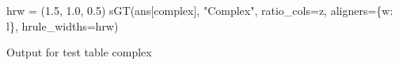 \documentclass[
  12pt,
  a4paper,
  DIV=11,
  numbers=noendperiod]{scrartcl}
\newenvironment{Shaded}{\begin{snugshade}}{\end{snugshade}}
\newcommand{\FloatTok}[1]{\textcolor[rgb]{0.68,0.00,0.00}{#1}}
\newcommand{\NormalTok}[1]{\textcolor[rgb]{0.00,0.23,0.31}{#1}}
\newcommand{\OperatorTok}[1]{\textcolor[rgb]{0.37,0.37,0.37}{#1}}
\newcommand{\StringTok}[1]{\textcolor[rgb]{0.13,0.47,0.30}{#1}}
\begin{document}
\begin{Shaded}
\begin{Highlighting}[]
\NormalTok{hrw }\OperatorTok{=}\NormalTok{ (}\FloatTok{1.5}\NormalTok{, }\FloatTok{1.0}\NormalTok{, }\FloatTok{0.5}\NormalTok{)}
\NormalTok{sGT(ans[}\StringTok{\textquotesingle{}complex\textquotesingle{}}\NormalTok{], }\StringTok{"Complex"}\NormalTok{, ratio\_cols}\OperatorTok{=}\StringTok{\textquotesingle{}z\textquotesingle{}}\NormalTok{, aligners}\OperatorTok{=}\NormalTok{\{}\StringTok{\textquotesingle{}w\textquotesingle{}}\NormalTok{: }\StringTok{\textquotesingle{}l\textquotesingle{}}\NormalTok{\},}
\NormalTok{        hrule\_widths}\OperatorTok{=}\NormalTok{hrw)}
\end{Highlighting}
\end{Shaded}

\begin{table}

\caption{\label{tbl-greater-tables-test-4}Output for test table complex}


\end{table}
\end{document}
